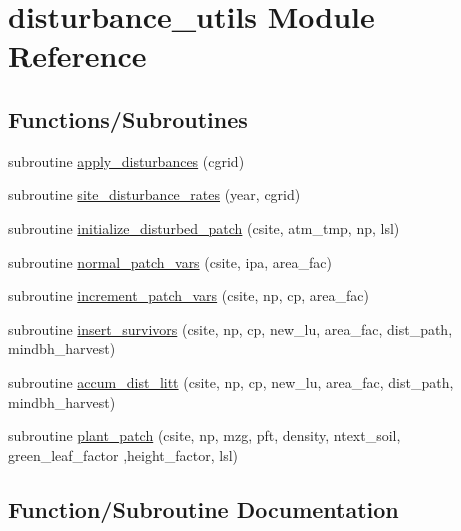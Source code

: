 \hypertarget{namespacedisturbance__utils}{}\section{disturbance\+\_\+utils Module Reference}
\label{namespacedisturbance__utils}
\subsection*{Functions/\+Subroutines}
\begin{DoxyCompactItemize}
\item 
subroutine \hyperlink{namespacedisturbance__utils_a29d6db4e94463404643e5c3666c67767}{apply\+\_\+disturbances} (cgrid)
\item 
subroutine \hyperlink{namespacedisturbance__utils_a9045765ed99ce8acf000838b2c532deb}{site\+\_\+disturbance\+\_\+rates} (year, cgrid)
\item 
subroutine \hyperlink{namespacedisturbance__utils_a31b6105dc67086438d6827bbffaf4bc4}{initialize\+\_\+disturbed\+\_\+patch} (csite, atm\+\_\+tmp, np, lsl)
\item 
subroutine \hyperlink{namespacedisturbance__utils_ae56e66a56b934ca784a19bd3c0bc2796}{normal\+\_\+patch\+\_\+vars} (csite, ipa, area\+\_\+fac)
\item 
subroutine \hyperlink{namespacedisturbance__utils_a60d031d31fcde31370f73cebaaaadb24}{increment\+\_\+patch\+\_\+vars} (csite, np, cp, area\+\_\+fac)
\item 
subroutine \hyperlink{namespacedisturbance__utils_ac25d6a408136dff3bccca56269ca858f}{insert\+\_\+survivors} (csite, np, cp, new\+\_\+lu, area\+\_\+fac, dist\+\_\+path, mindbh\+\_\+harvest)
\item 
subroutine \hyperlink{namespacedisturbance__utils_a5e78ef6d3bd2f31c0abfaf8e86045187}{accum\+\_\+dist\+\_\+litt} (csite, np, cp, new\+\_\+lu, area\+\_\+fac, dist\+\_\+path, mindbh\+\_\+harvest)
\item 
subroutine \hyperlink{namespacedisturbance__utils_a9fc5ab9ef8e1fa7eb1798412d868db50}{plant\+\_\+patch} (csite, np, mzg, pft, density, ntext\+\_\+soil, green\+\_\+leaf\+\_\+factor                                                                                                                                           ,height\+\_\+factor, lsl)
\end{DoxyCompactItemize}


\subsection{Function/\+Subroutine Documentation}
\hypertarget{namespacedisturbance__utils_a5e78ef6d3bd2f31c0abfaf8e86045187}{}

